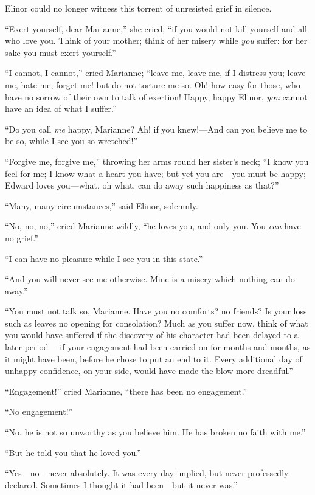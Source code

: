 \documentclass{article}
\begin{document}
Elinor could no longer witness this torrent
of unresisted grief in silence.

``Exert yourself, dear Marianne,'' she cried,
``if you would not kill yourself and all who love you.
Think of your mother; think of her misery while \emph{you} suffer:
for her sake you must exert yourself.''

``I cannot, I cannot,'' cried Marianne; ``leave me,
leave me, if I distress you; leave me, hate me, forget me!
but do not torture me so.  Oh! how easy for those,
who have no sorrow of their own to talk of exertion!  Happy,
happy Elinor, \emph{you} cannot have an idea of what I suffer.''

``Do you call \emph{me} happy, Marianne?  Ah! if you knew!---And
can you believe me to be so, while I see you so wretched!''

``Forgive me, forgive me,'' throwing her arms round
her sister's neck; ``I know you feel for me; I know what
a heart you have; but yet you are---you must be happy;
Edward loves you---what, oh what, can do away such happiness
as that?''

``Many, many circumstances,'' said Elinor, solemnly.

``No, no, no,'' cried Marianne wildly, ``he loves you,
and only you.  You \emph{can} have no grief.''

``I can have no pleasure while I see you in this state.''

``And you will never see me otherwise.  Mine is
a misery which nothing can do away.''

``You must not talk so, Marianne.  Have you no
comforts? no friends?  Is your loss such as leaves
no opening for consolation?  Much as you suffer now,
think of what you would have suffered if the discovery
of his character had been delayed to a later period---%
if your engagement had been carried on for months and months,
as it might have been, before he chose to put an end to it.
Every additional day of unhappy confidence, on your side,
would have made the blow more dreadful.''

``Engagement!'' cried Marianne, ``there has been
no engagement.''

``No engagement!''

``No, he is not so unworthy as you believe him.
He has broken no faith with me.''

``But he told you that he loved you.''

``Yes---no---never absolutely.  It was every day implied,
but never professedly declared.  Sometimes I thought it
had been---but it never was.''
\end{document}
